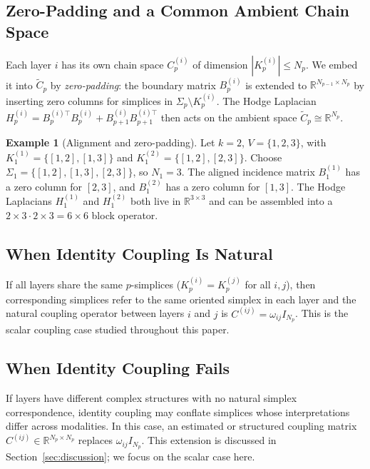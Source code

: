 \documentclass[11pt]{article}
\theoremstyle{definition}
\newtheorem{example}[theorem]{Example}
\theoremstyle{remark}
\newcommand{\R}{\mathbb{R}}
\newcommand{\Ctil}{\widetilde{C}}
\begin{document}
\subsection{Zero-Padding and a Common Ambient Chain Space}

Each layer $i$ has its own chain space $C_p^{(i)}$ of dimension
$|K_p^{(i)}|\leq N_p$. We embed it into $\Ctil_p$ by \emph{zero-padding}: the
boundary matrix $B_p^{(i)}$ is extended to $\R^{N_{p-1}\times N_p}$ by
inserting zero columns for simplices in $\Sigma_p\setminus K_p^{(i)}$. The
Hodge Laplacian $H_p^{(i)} = B_p^{(i)\top}B_p^{(i)} + B_{p+1}^{(i)}
B_{p+1}^{(i)\top}$ then acts on the ambient space $\Ctil_p \cong \R^{N_p}$.

\begin{example}[Alignment and zero-padding]
\label{ex:align}
Let $k=2$, $V=\{1,2,3\}$, with $K_1^{(1)}=\{[1,2],[1,3]\}$ and
$K_1^{(2)}=\{[1,2],[2,3]\}$. Choose $\Sigma_1=\{[1,2],[1,3],[2,3]\}$,
so $N_1=3$. The aligned incidence matrix $B_1^{(1)}$ has a zero column for
$[2,3]$, and $B_1^{(2)}$ has a zero column for $[1,3]$. The Hodge Laplacians
$H_1^{(1)}$ and $H_1^{(2)}$ both live in $\R^{3\times 3}$ and can be assembled
into a $2\times 3 \cdot 2\times 3 = 6\times 6$ block operator.
\end{example}

\subsection{When Identity Coupling Is Natural}

If all layers share the same $p$-simplices ($K_p^{(i)}=K_p^{(j)}$ for all
$i,j$), then corresponding simplices refer to the same oriented simplex in each layer and the natural
coupling operator between layers $i$ and $j$ is $C^{(ij)}=\omega_{ij}I_{N_p}$.
This is the scalar coupling case studied throughout this paper.

\subsection{When Identity Coupling Fails}

If layers have different complex structures with no natural simplex
correspondence, identity coupling may conflate simplices whose interpretations differ across modalities.
In this case, an estimated or structured coupling matrix $C^{(ij)}\in\R^{N_p\times
N_p}$ replaces $\omega_{ij}I_{N_p}$. This extension is discussed in
Section~\ref{sec:discussion}; we focus on the scalar case here.
\end{document}
